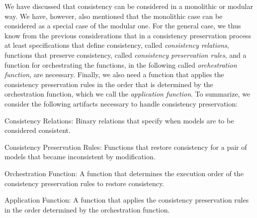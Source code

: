 We have discussed that consistency can be considered in a monolithic or modular way. We have, however, also mentioned that the monolithic case can be considered as a special case of the modular one.
For the general case, we thus know from the previous considerations that in a consistency preservation process at least specifications that define consistency, called \emph{consistency relations}, functions that preserve consistency, called \emph{consistency preservation rules}, and a function for orchestrating the functions, in the following called \emph{orchestration function}, are necessary. Finally, we also need a function that applies the consistency preservation rules in the order that is determined by the orchestration function, which we call the \emph{application function}.
To summarize, we consider the following artifacts necessary to handle consistency preservation:
\begin{properdescription}
    \item[Consistency Relations:] Binary relations that specify when models are to be considered consistent.
    \item[Consistency Preservation Rules:] Functions that restore consistency for a pair of models that became inconsistent by modification.
    \item[Orchestration Function:] A function that determines the execution order of the consistency preservation rules to restore consistency.
    \item[Application Function:] A function that applies the consistency preservation rules in the order determined by the orchestration function. 
\end{properdescription}

